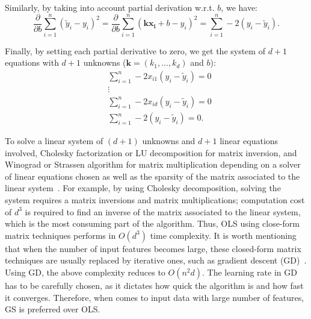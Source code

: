\documentclass[a4paper,12pt]{elsarticle}
\begin{document}
	Similarly, by taking into account  partial derivation w.r.t. $b$, we have: 
	$$  \frac{\partial}{\partial b} \sum_{i=1}^{n} (\tilde{y}_i - y_i)^2  = \frac{\partial}{\partial b} \sum_{i=1}^{n} ( \mathbf{k}\mathbf{x_i}+b  - y_i)^2 = \sum_{i=1}^{n} -2  (y_i - \tilde{y}_i). $$
	
	Finally, by setting each partial derivative to zero, we get the system of $d+1$ equations with $d+1$ unknowns ($\mathbf{k}=(k_1, ..., k_d)$ and $b$): 
	\begin{align*}
		& \sum_{i=1}^{n} -2x_{i1} (y_i - \tilde{y}_i) = 0 \\
		& \vdots \\
		& \sum_{i=1}^{n} -2x_{id} (y_i - \tilde{y}_i) = 0 \\
		&\sum_{i=1}^{n} -2  (y_i - \tilde{y}_i) = 0.
	\end{align*}

To solve a linear system of $(d+1)$ unknowns and $d+1$ linear equations involved,  Cholesky  factorization or LU decomposition for matrix inversion, and Winograd or Strassen algorithm for matrix multiplication depending on a solver of linear equations chosen as well as the sparsity of the matrix associated to the linear system~\cite{krishnamoorthy2013matrix}. For example, by using Cholesky decomposition, solving the system requires a matrix inversions and matrix multiplications;  computation cost of $d^3$ is required to find an inverse of the matrix associated to the linear system, which is the most consuming part of the algorithm. Thus, OLS using close-form matrix techniques performs in $O(d^3)$ time complexity.  %
It is worth mentioning that when the number of input features becomes large, these closed-form matrix techniques are usually replaced by iterative ones, such as gradient descent (GD)~\cite{andrychowicz2016learning}. Using GD,  the above complexity reduces to $O(n^2d )$. The learning rate in GD has to be carefully chosen, as it dictates how quick the algorithm is and how fast it converges. Therefore, when comes to input data with large number of features, GS is preferred over OLS.
\end{document}
